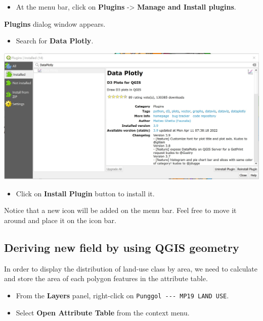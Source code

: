 \documentclass[
  letterpaper,
  DIV=11,
  numbers=noendperiod]{scrreprt}
\providecommand{\tightlist}{%
  \setlength{\itemsep}{0pt}\setlength{\parskip}{0pt}}\usepackage{longtable,booktabs,array}
\begin{document}
\begin{itemize}
\tightlist
\item
  At the menu bar, click on \textbf{Plugins} -\textgreater{}
  \textbf{Manage and Install plugins}.
\end{itemize}

\textbf{Plugins} dialog window appears.

\begin{itemize}
\tightlist
\item
  Search for \textbf{Data Plotly}.
\end{itemize}

\includegraphics{./img04/image33.jpg}

\begin{itemize}
\tightlist
\item
  Click on \textbf{Install Plugin} button to install it.
\end{itemize}

Notice that a new icon will be added on the menu bar. Feel free to move
it around and place it on the icon bar.

\hypertarget{deriving-new-field-by-using-qgis-geometry}{%
\subsection{Deriving new field by using QGIS
geometry}\label{deriving-new-field-by-using-qgis-geometry}}

In order to display the distribution of land-use class by area, we need
to calculate and store the area of each polygon features in the
attribute table.

\begin{itemize}
\item
  From the \textbf{Layers} panel, right-click on
  \texttt{Punggol\ -\/-\/-\ MP19\ LAND\ USE}.
\item
  Select \textbf{Open Attribute Table} from the context menu.
\end{itemize}
\end{document}
